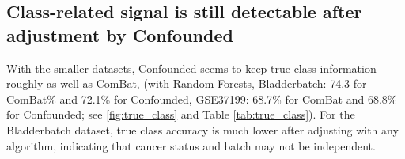 \documentclass[11pt]{article}
\begin{document}
\subsection{Class-related signal is still detectable after adjustment by Confounded}

With the smaller datasets, Confounded seems to keep true class information roughly as well as ComBat, (with Random Forests, Bladderbatch: 74.3 for ComBat\% and 72.1\% for Confounded, GSE37199: 68.7\% for ComBat and 68.8\% for Confounded; see \figurename{} \ref{fig:true_class} and Table \ref{tab:true_class}).
For the Bladderbatch dataset, true class accuracy is much lower after adjusting with any algorithm, indicating that cancer status and batch may not be independent.
\end{document}
